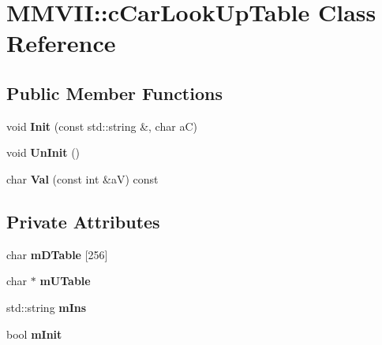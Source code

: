 \hypertarget{classMMVII_1_1cCarLookUpTable}{}\section{M\+M\+V\+II\+:\+:c\+Car\+Look\+Up\+Table Class Reference}
\label{classMMVII_1_1cCarLookUpTable}
\subsection*{Public Member Functions}
\begin{DoxyCompactItemize}
\item 
void {\bfseries Init} (const std\+::string \&, char aC)\hypertarget{classMMVII_1_1cCarLookUpTable_aa222571015ea122fcf188e4e275296a0}{}\label{classMMVII_1_1cCarLookUpTable_aa222571015ea122fcf188e4e275296a0}

\item 
void {\bfseries Un\+Init} ()\hypertarget{classMMVII_1_1cCarLookUpTable_a4b69bc98a0ae459ba10c44ea11de2689}{}\label{classMMVII_1_1cCarLookUpTable_a4b69bc98a0ae459ba10c44ea11de2689}

\item 
char {\bfseries Val} (const int \&aV) const \hypertarget{classMMVII_1_1cCarLookUpTable_a0d37ee9ec671a77b5ee55ae5e3a59455}{}\label{classMMVII_1_1cCarLookUpTable_a0d37ee9ec671a77b5ee55ae5e3a59455}

\end{DoxyCompactItemize}
\subsection*{Private Attributes}
\begin{DoxyCompactItemize}
\item 
char {\bfseries m\+D\+Table} \mbox{[}256\mbox{]}\hypertarget{classMMVII_1_1cCarLookUpTable_af778fa07b0277796c8e874ab5e36c3ff}{}\label{classMMVII_1_1cCarLookUpTable_af778fa07b0277796c8e874ab5e36c3ff}

\item 
char $\ast$ {\bfseries m\+U\+Table}\hypertarget{classMMVII_1_1cCarLookUpTable_a718cf2d80b2ab667d65e7071a3d5cf02}{}\label{classMMVII_1_1cCarLookUpTable_a718cf2d80b2ab667d65e7071a3d5cf02}

\item 
std\+::string {\bfseries m\+Ins}\hypertarget{classMMVII_1_1cCarLookUpTable_af3d6e23c9b241e3aec4290102c27a3e8}{}\label{classMMVII_1_1cCarLookUpTable_af3d6e23c9b241e3aec4290102c27a3e8}

\item 
bool {\bfseries m\+Init}\hypertarget{classMMVII_1_1cCarLookUpTable_a23ee05d4e19450d93c5b9008de3022f3}{}\label{classMMVII_1_1cCarLookUpTable_a23ee05d4e19450d93c5b9008de3022f3}

\end{DoxyCompactItemize}


